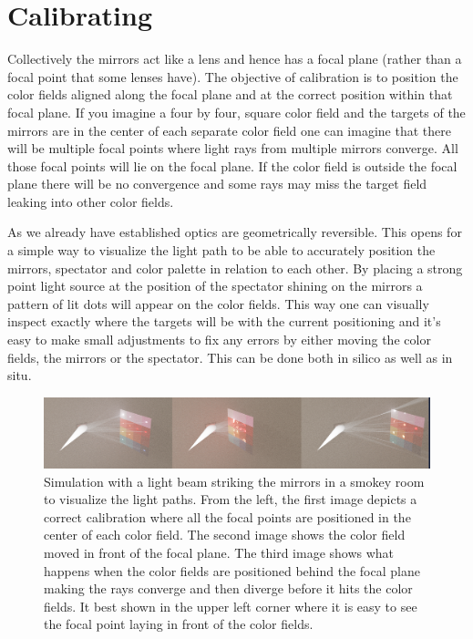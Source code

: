 \documentclass{article}
\begin{document}
\section{Calibrating}

Collectively the mirrors act like a lens and hence has a focal plane
(rather than a focal point that some lenses have). The objective of
calibration is to position the color fields aligned along the focal
plane and at the correct position within that focal plane. If you
imagine a four by four, square color field and the targets of the
mirrors are in the center of each separate color field one can imagine
that there will be multiple focal points where light rays from multiple
mirrors converge. All those focal points will lie on the focal plane. 
If the color field is outside the focal plane there
will be no convergence and some rays may miss the target field leaking
into other color fields.

As we already have established optics are geometrically reversible. This
opens for a simple way to visualize the light path to be able to
accurately position the mirrors, spectator and color palette in
relation to each other. By placing a strong point light source at the
position of the spectator shining on the mirrors a pattern of lit dots
will appear on the color fields. This way one can visually inspect
exactly where the targets will be with the current positioning and it's
easy to make small adjustments to fix any errors by either moving the
color fields, the mirrors or the spectator. This can be done both in
silico as well as in situ.

\begin{figure}[ht!]
\centering
\includegraphics[width=1.0\textwidth]{images/simulation/calibration.png}
\caption{Simulation with a light beam striking the mirrors in a smokey room to visualize the light paths. From the left, the first image depicts a correct calibration where all the focal points are positioned in the center of each color field. The second image shows the color field moved in front of the focal plane. The third image shows what happens when the color fields are positioned behind the focal plane making the rays converge and then diverge before it hits the color fields. It best shown in the upper left corner where it is easy to see the focal point laying in front of the color fields.}
\end{figure}
\end{document}
